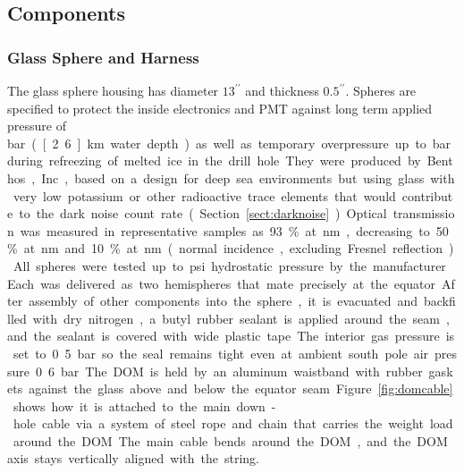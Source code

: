 \subsection{\label{sec:dom_components} Components}

\subsubsection{\label{sec:sphere}Glass Sphere and Harness}

The glass sphere housing has diameter $13^{\prime\prime}$ and thickness $0.5^{\prime\prime}$.  
Spheres are specified to protect the inside electronics and PMT against long term applied pressure of 
\unit[250]bar (\unit[2.6]km water depth)
as well as temporary overpressure up to \unit[690]bar during refreezing of melted ice in the drill hole.
They were produced by Benthos, Inc., based on a design for deep sea environments but using glass
with very low potassium or other radioactive trace elements that would contribute to the dark noise
count rate (Section~\ref{sect:darknoise}).  
Optical transmission was measured in representative samples as 93\% at \unit[400]nm,
decreasing to 50\% at \unit[340]nm and 10\% at \unit[315]nm (normal incidence, excluding Fresnel reflection).

All spheres were tested up to \unit[10,000]psi hydrostatic pressure by the manufacturer.
Each was delivered as two hemispheres that mate precisely at the equator.
After assembly of other components into the sphere, it is evacuated and backfilled with dry nitrogen,
a butyl rubber sealant is applied around the seam, and the sealant is covered with wide plastic tape.
The interior gas pressure is set to 0.5 bar so the seal remains tight even
at ambient south pole air pressure 0.6 bar.

The DOM is held by an aluminum waistband with rubber gaskets against
the glass above and below the equator seam. 
Figure~\ref{fig:domcable} shows how it is attached to the main down-hole cable via a system
of steel rope and chain that carries the weight load around the DOM.
The main cable bends around the DOM, and the DOM axis stays vertically aligned with the string.

